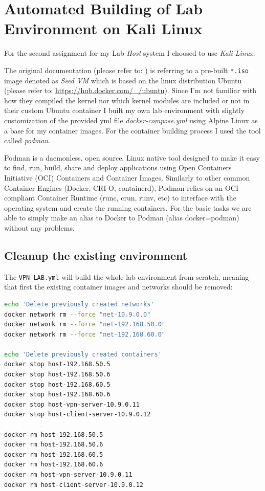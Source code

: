 \section{Automated Building of Lab Environment on Kali Linux}
\label{apx:lab-final_envbuild}

For the second assignment for my Lab \textit{Host} system I choosed to use \textit{Kali Linux}\cite{os.kali}. 

The original documentation (please refer to: \cite{seedlab2024}) is referring to a pre-built \lstinline{*.iso} image denoted as \textit{Seed VM} which is based on the linux distribution Ubuntu (please refer to: \url{https://hub.docker.com/_/ubuntu}).  Since I'm not familiar with how they compiled the kernel nor which kernel modules are included or not in their custom Ubuntu container I built my own lab environment with slightly customization of the provided yml file \textit{docker-compose.yml} using Alpine Linux as a base for my container images.  For the container building process I used the tool called \textit{podman}\cite{podman}.

Podman is a daemonless, open source, Linux native tool designed to make it easy to find, run, build, share and deploy applications using Open Containers Initiative (OCI)\cite{oci.containers} Containers and Container Images.\cite{podman} Similarly to other common Container Engines (Docker, CRI-O, containerd), Podman relies on an OCI compliant Container Runtime (runc, crun, runv, etc) to interface with the operating system and create the running containers.\cite{podman} For the basic tasks we are able to simply make an alias to Docker to Podman (alias docker=podman) without any problems. 

\subsection{Cleanup the existing environment}

The \lstinline{VPN_LAB.yml} will build the whole lab environment from scratch, meaning that first the existing container images and networks should be removed:

\begin{lstlisting}[language=bash, caption=Host preparation for building the environment]
echo 'Delete previously created networks'
docker network rm --force "net-10.9.0.0"
docker network rm --force "net-192.168.50.0"
docker network rm --force "net-192.168.60.0"

echo 'Delete previously created containers'
docker stop host-192.168.50.5
docker stop host-192.168.50.6
docker stop host-192.168.60.5
docker stop host-192.168.60.6
docker stop host-vpn-server-10.9.0.11
docker stop host-client-server-10.9.0.12

docker rm host-192.168.50.5
docker rm host-192.168.50.6
docker rm host-192.168.60.5
docker rm host-192.168.60.6
docker rm host-vpn-server-10.9.0.11
docker rm host-client-server-10.9.0.12
\end{lstlisting}


